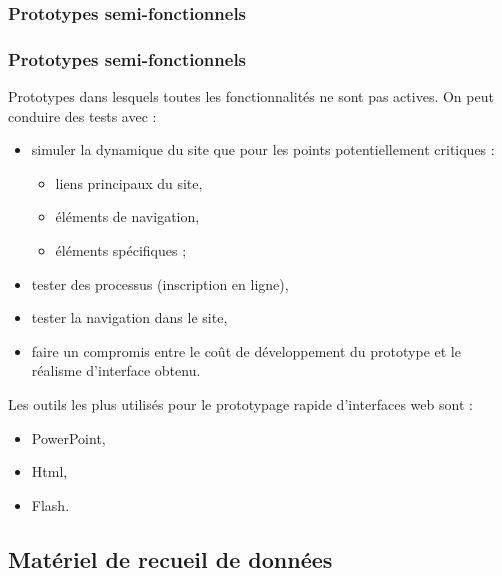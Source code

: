 		
		\subsubsection{Prototypes semi-fonctionnels} 
		 
		\begin{frame}[allowframebreaks]
		\frametitle{Prototypes semi-fonctionnels}
		Prototypes dans lesquels toutes les fonctionnalités ne sont pas actives.  
		On peut conduire des tests avec :
			\begin {itemize}
				      \item simuler la dynamique du site que pour les points potentiellement critiques : 
				      		\begin {itemize}
				      		\item liens principaux du site, 
				      		\item éléments de navigation, 
				      		\item éléments spécifiques ;
				      		\end{itemize}
				      	\item tester des processus (inscription en ligne),
				      	\item tester la navigation dans le site, 
				      	\item faire un compromis entre le coût de développement du prototype et le réalisme d'interface obtenu. 
			   
			\end{itemize}
			Les outils les plus utilisés pour le prototypage rapide d'interfaces web sont :
			\begin {itemize}
				      \item PowerPoint,
				      \item Html,
				      \item Flash. 
			\end{itemize}
			
		\end{frame}   
		
		\subsection{Matériel de recueil de données} 
		
